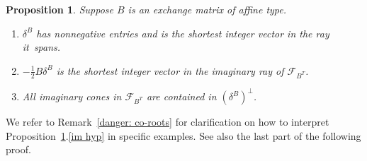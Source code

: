 \documentclass{amsart}
\newtheorem{proposition}{Proposition}[section]
\theoremstyle{definition}
\theoremstyle{remark}
\numberwithin{equation}{section}
\newcommand{\F}{{\mathcal F}}
\newcommand{\0}{{\mathbf{0}}}
\begin{document}
\begin{proposition}\label{delta is the man}
Suppose $B$ is an exchange matrix of affine type.
\begin{enumerate}[label=\bf\arabic*., ref=\arabic*]
\item \label{im ray pos}
$\delta^B$ has nonnegative entries and is the shortest integer vector in the ray it~spans.  \item \label{im ray}
$-\frac12B\delta^B$ is the shortest integer vector in the imaginary ray of $\F_{B^T}$.
\item \label{im hyp}
All imaginary cones in $\F_{B^T}$ are contained in $(\delta^B)^\perp$.
\end{enumerate}
\end{proposition}

We refer to Remark~\ref{danger: co-roots} for clarification on how to interpret Proposition~\ref{delta is the man}.\ref{im hyp} in specific examples.
See also the last part of the following proof.
\end{document}

